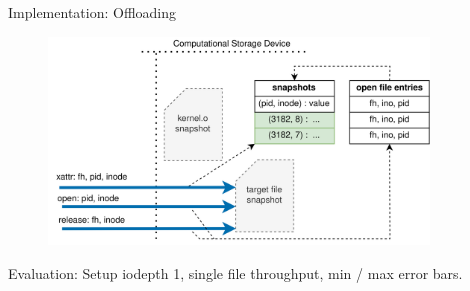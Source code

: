 \documentclass{beamer}
\begin{document}
\begin{frame}{Implementation: Offloading}
	\begingroup
	\small %
	\begin{figure}
		\centering
		\includegraphics[width=0.9\textwidth]{resources/images/offloading-management.png}
	\end{figure}
	\endgroup
\end{frame}

\begin{frame}{Evaluation: Setup}
	\begingroup
	\tiny iodepth 1, single file throughput, min / max error bars.
	
	\endgroup
\end{frame}
\end{document}
